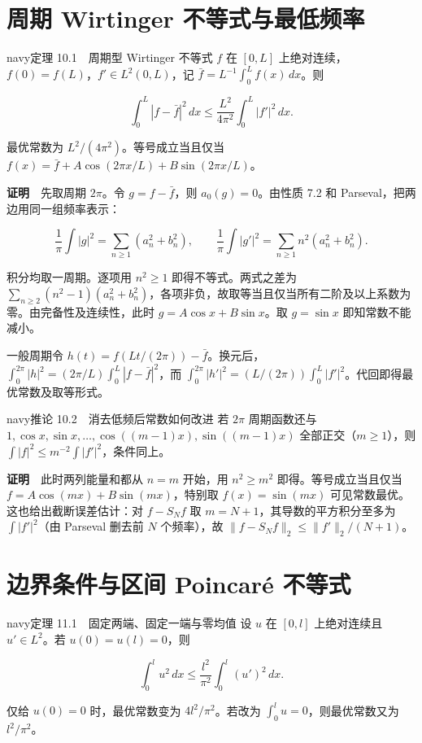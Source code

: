 \documentclass[12pt,a4paper]{article}
\newcommand{\mysection}[1]{\clearpage\section{#1}}
\begin{document}
\mysection{周期 Wirtinger 不等式与最低频率}




\begin{sboxenv}{navy}{定理 10.1　周期型 Wirtinger 不等式}
\(f\) 在 \([0,L]\) 上绝对连续，\(f(0)=f(L)\)，\(f'\in L^2(0,L)\)，记 \(\bar f=L^{-1}\int_0^L f(x)\,dx\)。则

\[
\int_0^L |f-\bar f|^2\,dx\le
\frac{L^2}{4\pi^2}\int_0^L |f'|^2\,dx .
\]

最优常数为 \(L^2/(4\pi^2)\)。等号成立当且仅当 \(f(x)=\bar f+A\cos(2\pi x/L)+B\sin(2\pi x/L)\)。
\end{sboxenv}

\textbf{证明}　先取周期 \(2\pi\)。令 \(g=f-\bar f\)，则 \(a_0(g)=0\)。由性质 7.2 和 Parseval，把两边用同一组频率表示：

\[
 \frac1\pi\int |g|^2=\sum_{n\ge1}(a_n^2+b_n^2),\qquad
 \frac1\pi\int |g'|^2=\sum_{n\ge1}n^2(a_n^2+b_n^2).
\]

积分均取一周期。逐项用 \(n^2\ge1\) 即得不等式。两式之差为 \(\sum_{n\ge2}(n^2-1)(a_n^2+b_n^2)\)，各项非负，故取等当且仅当所有二阶及以上系数为零。由完备性及连续性，此时 \(g=A\cos x+B\sin x\)。取 \(g=\sin x\) 即知常数不能减小。

一般周期令 \(h(t)=f(Lt/(2\pi))-\bar f\)。换元后，\(\int_0^{2\pi}|h|^2=(2\pi/L)\int_0^L|f-\bar f|^2\)，而 \(\int_0^{2\pi}|h'|^2=(L/(2\pi))\int_0^L|f'|^2\)。代回即得最优常数及取等形式。

\begin{sboxenv}{navy}{推论 10.2　消去低频后常数如何改进}
若 \(2\pi\) 周期函数还与 \(1,\cos x,\sin x,\ldots,\cos((m-1)x),\sin((m-1)x)\) 全部正交（\(m\ge1\)），则 \(\int |f|^2\le m^{-2}\int|f'|^2\)，条件同上。
\end{sboxenv}

\textbf{证明}　此时两列能量和都从 \(n=m\) 开始，用 \(n^2\ge m^2\) 即得。等号成立当且仅当 \(f=A\cos(mx)+B\sin(mx)\)，特别取 \(f(x)=\sin(mx)\) 可见常数最优。这也给出截断误差估计：对 \(f-S_N f\) 取 \(m=N+1\)，其导数的平方积分至多为 \(\int|f'|^2\)（由 Parseval 删去前 \(N\) 个频率），故 \(\|f-S_N f\|_2\le\|f'\|_2/(N+1)\)。

\mysection{边界条件与区间 Poincaré 不等式}




\begin{sboxenv}{navy}{定理 11.1　固定两端、固定一端与零均值}
设 \(u\) 在 \([0,l]\) 上绝对连续且 \(u'\in L^2\)。若 \(u(0)=u(l)=0\)，则

\[
\int_0^l u^2\,dx\le\frac{l^2}{\pi^2}\int_0^l (u')^2\,dx .
\]

仅给 \(u(0)=0\) 时，最优常数变为 \(4l^2/\pi^2\)。若改为 \(\int_0^l u=0\)，则最优常数又为 \(l^2/\pi^2\)。
\end{sboxenv}
\end{document}
